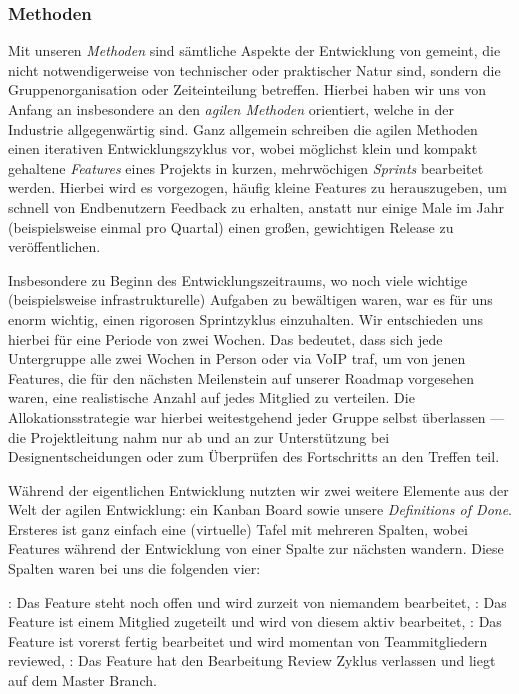 
\subsubsection{Methoden}
\label{team:orga-workflow-methods}
\vspace{-0.2cm}

Mit unseren \emph{Methoden} sind sämtliche Aspekte der Entwicklung von \erasim{}
gemeint, die nicht notwendigerweise von technischer oder praktischer Natur sind,
sondern die Gruppenorganisation oder Zeiteinteilung betreffen. Hierbei haben wir
uns von Anfang an insbesondere an den \emph{agilen Methoden} orientiert, welche
in der Industrie allgegenwärtig sind. Ganz allgemein schreiben die agilen
Methoden einen iterativen Entwicklungszyklus vor, wobei möglichst klein und
kompakt gehaltene \emph{Features} eines Projekts in kurzen, mehrwöchigen
\emph{Sprints} bearbeitet werden. Hierbei wird es vorgezogen, häufig kleine
Features zu herauszugeben, um schnell von Endbenutzern Feedback zu erhalten,
anstatt nur einige Male im Jahr (beispielsweise einmal pro Quartal) einen
großen, gewichtigen Release zu veröffentlichen.

Insbesondere zu Beginn des Entwicklungszeitraums, wo noch viele wichtige
(beispielsweise infrastrukturelle) Aufgaben zu bewältigen waren, war es für uns
enorm wichtig, einen rigorosen Sprintzyklus einzuhalten. Wir entschieden uns
hierbei für eine Periode von zwei Wochen. Das bedeutet, dass sich jede
Untergruppe alle zwei Wochen in Person oder via VoIP traf, um von jenen
Features, die für den nächsten Meilenstein auf unserer Roadmap vorgesehen waren,
eine realistische Anzahl auf jedes Mitglied zu verteilen. Die
Allokationsstrategie war hierbei weitestgehend jeder Gruppe selbst überlassen
--- die Projektleitung nahm nur ab und an zur Unterstützung bei
Designentscheidungen oder zum Überprüfen des Fortschritts an den Treffen teil.

Während der eigentlichen Entwicklung nutzten wir zwei weitere Elemente aus der
Welt der agilen Entwicklung: ein Kanban Board sowie unsere \emph{Definitions
of Done}. Ersteres ist ganz einfach eine (virtuelle) Tafel mit mehreren Spalten,
wobei Features während der Entwicklung von einer Spalte zur nächsten wandern.
Diese Spalten waren bei uns die folgenden vier:
\begin{senumerate}{-0.5cm}
  : Das Feature steht noch offen und wird zurzeit von niemandem
  bearbeitet,
  : Das Feature ist einem Mitglied zugeteilt und wird von
  diesem aktiv bearbeitet,
  : Das Feature ist vorerst fertig bearbeitet und wird momentan
  von Teammitgliedern reviewed,
  : Das Feature hat den Bearbeitung \cyclearrow Review Zyklus verlassen und liegt auf dem Master Branch.
\end{senumerate}
\vspace{-0.5cm}

